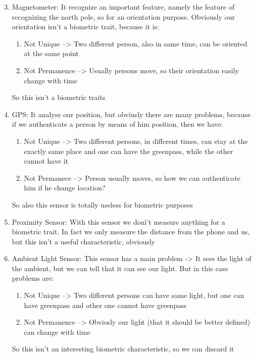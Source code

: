 \documentclass[12pt]{article}
\begin{document}
\begin{enumerate}
  \setcounter{enumi}{2}
  \item Magnetometer: It recognize an important feature, namely the feature of recognizing the north pole, so for an orientation purpose. Obviously our orientation isn't a biometric trait, because it is:
    \begin{enumerate}
    \item Not Unique --> Two different person, also in same time, can be oriented at the same point
    \item Not Permanence --> Usually persons move, so their orientation easily change with time
    \end{enumerate}
    So this isn't a biometric traits

    \item GPS: It analyse our position, but obviusly there are many problems, because if we authenticate a person by means of him position, then we have:
    \begin{enumerate}
    
    \item Not Unique --> Two different persons, in different times, can stay at the exactly same place and one can have the greenpass, while the other cannot have it
    \item Not Permanece --> Person usually moves, so how we can authenticate him if he change location?
    \end{enumerate}
    So also this sensor is totally useless for biometric purposes
    
    \item Proximity Sensor: With this sensor we donì't measure anything for a biometric trait. In fact we only measure the distance from the phone and us, but this isn't a useful characteristic, obviously

    \item Ambient Light Sensor: This sensor has a main problem -> It sees the light of the ambient, but we can tell that it can see our light. But in this case problems are:
    
    \begin{enumerate}
    
    \item Not Unique --> Two different persons can have same light, but one can have greenpass and other one cannot have greenpass
    \item Not Permanence --> Obviosly our light (that it should be better defined) can change with time
    
    \end{enumerate}
    
    So this isn't an interesting biometric characteristic, so we can discard it
    \end{enumerate}
\end{document}

